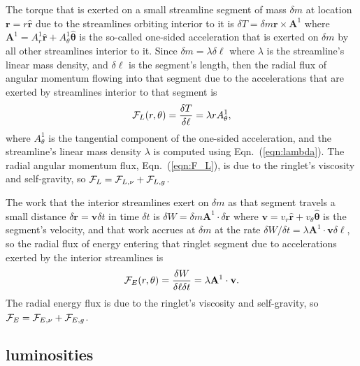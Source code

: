 \documentclass[preprint]{aastex62}
\begin{document}
The torque that is exerted on a small streamline segment of mass $\delta m$
at location $\mathbf{r}=r\hat{\mathbf{r}}$
due to the streamlines orbiting interior to it is $\delta T=\delta m\mathbf{r}\times\mathbf{A}^1$ where 
$\mathbf{A}^1=A^1_r\hat{\mathbf{r}} + A^1_\theta\hat{\boldsymbol\theta}$
is the so-called one-sided acceleration that is exerted on $\delta m$ by all other streamlines
interior to it. Since $\delta m=\lambda\delta\ell$ where $\lambda$ is the streamline's linear mass density,
and $\delta\ell$ is the segment's length, then the radial flux of angular momentum flowing into
that segment due to the accelerations that are exerted by streamlines interior to that
segment is
\begin{equation}
    \label{eqn:F_L}
    {\cal F}_L(r, \theta) = \frac{\delta T}{\delta\ell} = \lambda r A^1_\theta,
\end{equation}
where $A^1_\theta$ is the tangential component of the one-sided acceleration,
and the streamline's linear mass density $\lambda$ is computed using Eqn.\ (\ref{eqn:lambda}).
The radial angular momentum flux, Eqn.\ (\ref{eqn:F_L}), is due to the ringlet's viscosity and self-gravity,
so ${\cal F}_L = {\cal F}_{L,\nu} + {\cal F}_{L,g}$. 

The work that the interior streamlines exert on $\delta m$ as that segment travels a small distance
$\delta\mathbf{r}=\mathbf{v}\delta t$ in time $\delta t$
is $\delta W=\delta m\mathbf{A}^1\cdot\delta\mathbf{r}$ where 
$\mathbf{v}=v_r\hat{\mathbf{r}} + v_\theta\hat{\boldsymbol\theta}$ is the segment's velocity, and
that work accrues at $\delta m$ at the rate 
$\delta W/\delta t=\lambda\mathbf{A}^1\cdot\mathbf{v}\delta\ell$,
so the radial flux of energy entering that ringlet segment due to accelerations
exerted by the interior streamlines is 
\begin{equation}
    \label{eqn:F_E}
    {\cal F}_E(r, \theta) = \frac{\delta W}{\delta\ell\delta t} = \lambda\mathbf{A}^1\cdot\mathbf{v}.
\end{equation}
The radial energy flux is due to the ringlet's viscosity and self-gravity, so
${\cal F}_E = {\cal F}_{E,\nu} + {\cal F}_{E,g}$. 

\subsection{luminosities}
\label{subsec:luminosities}
\end{document}
